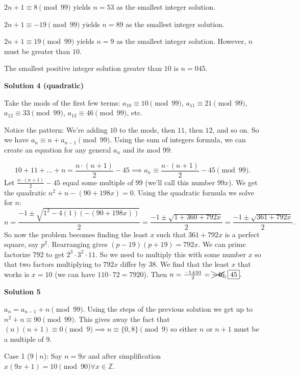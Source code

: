 \begin{enumerate}
 $2n+1 \equiv 8 \pmod {99}$ yields $n=53$ as the smallest integer solution.

 $2n+1 \equiv -19 \pmod {99}$ yields $n=89$ as the smallest integer solution.

 $2n+1 \equiv 19 \pmod {99}$ yields $n=9$ as the smallest integer solution. However, $n$ must be greater than $10$.

 The smallest positive integer solution greater than $10$ is $n=\boxed{045}$.

 



\textbf{Solution 4 (quadratic)}

Take the mods of the first few terms: $a_{10} \equiv 10 \pmod{99}$, $a_{11} \equiv 21 \pmod{99}$, $a_{12} \equiv 33 \pmod{99}$, $a_{13} \equiv 46 \pmod{99}$, etc.

 Notice the pattern: We're adding $10$ to the mods, then $11$, then $12$, and so on. So we have $a_{n} \equiv n + a_{n - 1} \pmod{99}.$ Using the sum of integers formula, we can create an equation for any general $a_n$ and its mod 99:

 
 \[10 + 11 + \dots + n = \frac{n \cdot (n + 1)}{2} - 45 \implies a_n \equiv \frac{n \cdot (n + 1)}{2} - 45 \pmod{99}.\] Let $\frac{n \cdot (n + 1)}{2} - 45$ equal some multiple of 99 (we'll call this number $99x$). We get the quadratic $n^2 + n - (90 + 198x) = 0.$ Using the quadratic formula we solve for $n$: 
 \[n = \frac{-1 \pm \sqrt{1^2 - 4(1)(-(90+198x))}}{2} = \frac{-1 \pm \sqrt{1 + 360 + 792x}}{2} = \frac{-1 \pm \sqrt{361 + 792x}}{2}.\] So now the problem becomes finding the least $x$ such that $361 + 792x$ is a perfect square, say $p^2.$ Rearranging gives $(p - 19)(p + 19) = 792x.$ We can prime factorize $792$ to get $2^3 \cdot 3^2 \cdot 11.$ So we need to multiply this with some number $x$ so that two factors multiplying to $792x$ differ by $38.$ We find that the least $x$ that works is $x = 10$ (we can have $110 \cdot 72 = 7920$). Then $n = \frac{-1 \pm 91}{2} = \xcancel{-46}, \boxed{45}.$




\textbf{Solution 5}

$a_n=a_{n-1} + n \pmod{99}$.  Using the steps of the previous solution we get up to $n^2+n \equiv 90 \pmod{99}$. This gives away the fact that $(n)(n+1) \equiv 0 \pmod{9} \implies n \equiv \{0, 8\} \pmod{9}$ so either $n$ or $n+1$ must be a multiple of 9. 

 Case 1 ($9 \mid n$): Say $n=9x$ and after simplification $x(9x+1) = 10 \pmod{90} \forall x \in \mathbb{Z}$.  


\end{enumerate}
